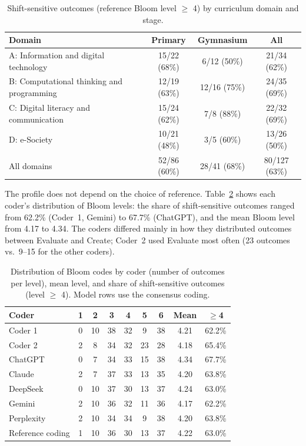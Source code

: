 \documentclass[journal,article,submit,pdftex,moreauthors]{Definitions/mdpi}
\begin{document}
\begin{table}[H]
\caption{Shift-sensitive outcomes (reference Bloom level $\geq$ 4) by curriculum domain and stage.}
\label{tab:domain}
\centering
\footnotesize
\begin{tabular}{lccc}
\toprule
\textbf{Domain} & \textbf{Primary} & \textbf{Gymnasium} & \textbf{All} \\
\midrule
A: Information and digital technology & 15/22 (68\%) & 6/12 (50\%) & 21/34 (62\%) \\
B: Computational thinking and programming & 12/19 (63\%) & 12/16 (75\%) & 24/35 (69\%) \\
C: Digital literacy and communication & 15/24 (62\%) & 7/8 (88\%) & 22/32 (69\%) \\
D: e-Society & 10/21 (48\%) & 3/5 (60\%) & 13/26 (50\%) \\
\midrule
All domains & 52/86 (60\%) & 28/41 (68\%) & 80/127 (63\%) \\
\bottomrule
\end{tabular}
\end{table}

The profile does not depend on the choice of reference. Table~\ref{tab:marginals} shows each coder's distribution of Bloom levels: the share of shift-sensitive outcomes ranged from 62.2\% (Coder~1, Gemini) to 67.7\% (ChatGPT), and the mean Bloom level from 4.17 to 4.34. The coders differed mainly in how they distributed outcomes between Evaluate and Create; Coder~2 used Evaluate most often (23 outcomes vs.\ 9--15 for the other coders).

\begin{table}[H]
\caption{Distribution of Bloom codes by coder (number of outcomes per level), mean level, and share of shift-sensitive outcomes (level $\geq$ 4). Model rows use the consensus coding.}
\label{tab:marginals}
\centering
\footnotesize
\setlength{\tabcolsep}{4pt}
\begin{tabular}{lcccccccc}
\toprule
\textbf{Coder} & \textbf{1} & \textbf{2} & \textbf{3} & \textbf{4} & \textbf{5} & \textbf{6} & \textbf{Mean} & \textbf{$\geq$4} \\
\midrule
Coder 1 & 0 & 10 & 38 & 32 & 9 & 38 & 4.21 & 62.2\% \\
Coder 2 & 2 & 8 & 34 & 32 & 23 & 28 & 4.18 & 65.4\% \\
\midrule
ChatGPT & 0 & 7 & 34 & 33 & 15 & 38 & 4.34 & 67.7\% \\
Claude & 2 & 7 & 37 & 33 & 13 & 35 & 4.20 & 63.8\% \\
DeepSeek & 0 & 10 & 37 & 30 & 13 & 37 & 4.24 & 63.0\% \\
Gemini & 2 & 10 & 36 & 32 & 11 & 36 & 4.17 & 62.2\% \\
Perplexity & 2 & 10 & 34 & 34 & 9 & 38 & 4.20 & 63.8\% \\
\midrule
Reference coding & 1 & 10 & 36 & 30 & 13 & 37 & 4.22 & 63.0\% \\
\bottomrule
\end{tabular}
\end{table}
\end{document}
